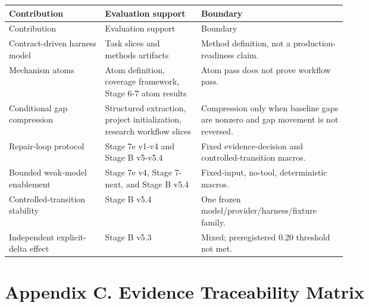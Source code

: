 \documentclass[11pt]{article}
\begin{document}
{\small
\setlength{\tabcolsep}{3pt}
\begin{longtable}{>{\raggedright\arraybackslash}p{0.220\linewidth}>{\raggedright\arraybackslash}p{0.220\linewidth}>{\raggedright\arraybackslash}p{0.220\linewidth}}
\toprule
Contribution & Evaluation support & Boundary \\
\midrule
\endfirsthead
\toprule
Contribution & Evaluation support & Boundary \\
\midrule
\endhead
Contract-driven harness model & Task slices and methods artifacts & Method definition, not a production-readiness claim. \\
Mechanism atoms & Atom definition, coverage framework, Stage 6-7 atom results & Atom pass does not prove workflow pass. \\
Conditional gap compression & Structured extraction, project initialization, research workflow slices & Compression only when baseline gaps are nonzero and gap movement is not reversed. \\
Repair-loop protocol & Stage 7e v1-v4 and Stage B v5-v5.4 & Fixed evidence-decision and controlled-transition macros. \\
Bounded weak-model enablement & Stage 7e v4, Stage 7-next, and Stage B v5.4 & Fixed-input, no-tool, deterministic macros. \\
Controlled-transition stability & Stage B v5.4 & One frozen model/provider/harness/fixture family. \\
Independent explicit-delta effect & Stage B v5.3 & Mixed; preregistered 0.20 threshold not met. \\
\bottomrule
\end{longtable}
}

\section{Appendix C. Evidence Traceability Matrix}
\end{document}
